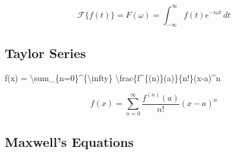 \documentclass[
  letterpaper,
  DIV=11,
  numbers=noendperiod]{scrartcl}
\newenvironment{Shaded}{\begin{snugshade}}{\end{snugshade}}
\newcommand{\SpecialCharTok}[1]{\textcolor[rgb]{0.37,0.37,0.37}{#1}}
\newcommand{\SpecialStringTok}[1]{\textcolor[rgb]{0.13,0.47,0.30}{#1}}
\begin{document}
\[\mathcal{F}\{f(t)\} = F(\omega) = \int_{-\infty}^{\infty} f(t) e^{-i\omega t} \, dt\]

\hypertarget{taylor-series}{%
\subsection{Taylor Series}\label{taylor-series}}

\begin{Shaded}
\begin{Highlighting}[]
\SpecialStringTok{$$f(x) = }\SpecialCharTok{\textbackslash{}sum}\SpecialStringTok{\_\{n=0\}\^{}\{}\SpecialCharTok{\textbackslash{}infty}\SpecialStringTok{\} }\SpecialCharTok{\textbackslash{}frac}\SpecialStringTok{\{f\^{}\{(n)\}(a)\}\{n!\}(x{-}a)\^{}n$$}
\end{Highlighting}
\end{Shaded}

\[f(x) = \sum_{n=0}^{\infty} \frac{f^{(n)}(a)}{n!}(x-a)^n\]

\hypertarget{maxwells-equations}{%
\subsection{Maxwell's Equations}\label{maxwells-equations}}
\end{document}
